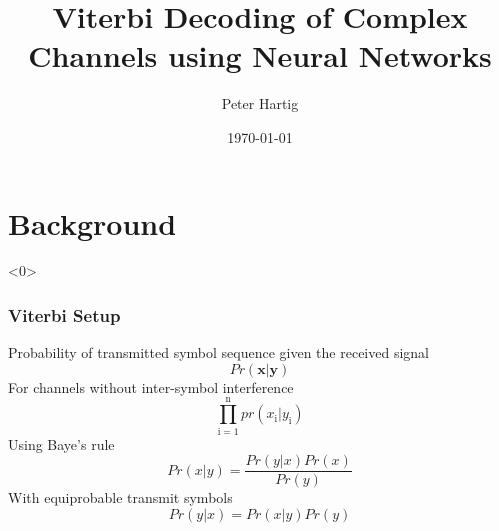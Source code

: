 \documentclass[10pt,tgadventor, onlymath]{beamer}
\title{\large \bfseries Viterbi Decoding of Complex Channels using Neural Networks}
\author{Peter Hartig\\[3ex]
}
\date{\today}
\begin{document}
\frame{
\thispagestyle{empty}
\titlepage
}

\section{Background}

\begin{frame}<0>
\frametitle{Viterbi Setup}
	Probability of transmitted symbol sequence given the received signal
	\begin{equation}
		Pr(\mathbf{x}|\mathbf{y})
	\end{equation}
	For channels without inter-symbol interference
	\begin{equation}
		\prod_{\mathrm{i=1}}^{\mathrm{n}}pr(x_{\mathrm{i}}|y_{\mathrm{i}}) 
	\end{equation}
	Using Baye's rule
	\begin{equation}
		Pr(x|y) = \frac{Pr(y|x) Pr(x)}{Pr(y)}
	\end{equation}
	With equiprobable transmit symbols
	\begin{equation}
		Pr(y|x) = Pr(x|y) Pr(y)
	\end{equation}

\end{frame}
\end{document}
